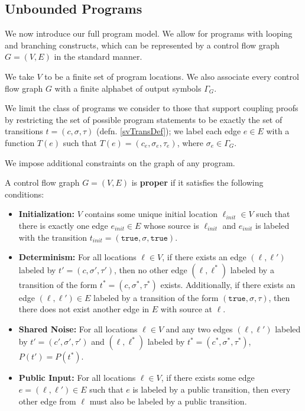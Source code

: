 
\subsection{Unbounded Programs}

We now introduce our full program model. We allow for programs with looping and branching constructs, which can be represented by a control flow graph $G = (V, E)$ in the standard manner. 

We take $V$ to be a finite set of program locations. We also associate every control flow graph $G$ with a finite alphabet of output symbols $\Gamma_G$.

We limit the class of programs we consider to those that support coupling proofs by restricting the set of possible program statements to be exactly the set of transitions $t = (c, \sigma, \tau)$ (defn. \ref{svTransDef}); we label each edge $e\in E$ with a function $T(e)$ such that $T(e) = (c_e, \sigma_e, \tau_e)$, where $\sigma_e \in \Gamma_G$. 

We impose additional constraints on the graph of any program. 

\begin{defn}
    A control flow graph $G = (V, E)$ is \textbf{proper} if it satisfies the following conditions: 
    \begin{itemize}
        \item \textbf{Initialization:} $V$ contains some unique initial location $\ell_{init}\in V$ such that there is exactly one edge $e_{init}\in E$ whose source is $\ell_{init}$ and $e_{init}$ is labeled with the transition $t_{init} = (\texttt{true}, \sigma, \texttt{true})$.
        \item \textbf{Determinism:} For all locations $\ell\in V$, if there exists an edge $(\ell, \ell')$ labeled by $t'=(c, \sigma', \tau')$, then no other edge $(\ell, \ell^*)$ labeled by a transition of the form $t^* = (c, \sigma^*, \tau^*)$ exists. 
        Additionally, if there exists an edge $(\ell, \ell')\in E$ labeled by a transition of the form $(\texttt{true}, \sigma, \tau)$, then there does not exist another edge in $E$ with source at $\ell$.
        \item \textbf{Shared Noise:} For all locations $\ell\in V$ and any two edges $(\ell, \ell')$ labeled by $t'=(c', \sigma', \tau')$ and $(\ell, \ell^*)$ labeled by $t^* = (c^*, \sigma^*, \tau^*)$, $P(t') = P(t^*)$. 
        \item \textbf{Public Input:} For all locations $\ell\in V$, if there exists some edge $e = (\ell, \ell') \in E$ such that $e$ is labeled by a public transition, then every other edge from $\ell$ must also be labeled by a public transition. 
\end{itemize}
\end{defn}


